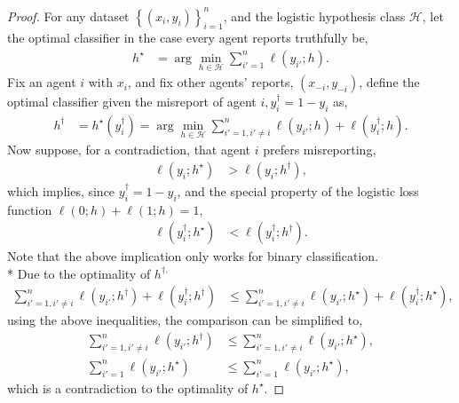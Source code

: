 \documentclass{article}
\begin{document}
\begin{proof} \label{proof:binpf} 
For any dataset $\left\{\left(x_{i}, y_{i}\right)\right\}_{i=1}^{n}$, and the logistic hypothesis class $\mathcal{H}$, let the optimal classifier in the case every agent reports truthfully be,
\begin{align*}
h^\star  &= \arg\displaystyle\min_{h \in \mathcal{H}} \displaystyle\sum_{i'=1}^{n} \ell\left(y_{i'}; h\right).
\end{align*}
Fix an agent $i $ with $x_{i}$, and fix other agents' reports, $\left(x_{-i}, y_{-i}\right)$, define the optimal classifier given the misreport of agent $i , y^{\dagger}_{i} = 1 - y_{i}$ as,
\begin{align*}
h^{\dagger} &= h^\star \left(y^{\dagger}_{i}\right) = \arg\displaystyle\min_{h \in \mathcal{H}} \displaystyle\sum_{i'=1, i' \neq  i}^{n} \ell\left(y_{i'} ; h\right) + \ell\left(y^{\dagger}_{i} ; h\right).
\end{align*}
Now suppose, for a contradiction, that agent $i $ prefers misreporting,
\begin{align*}
\ell\left(y_{i} ; h^\star \right) &> \ell\left(y_{i} ; h^{\dagger}\right),
\end{align*}
which implies, since $y^{\dagger}_{i} = 1 - y_{i}$, and the special property of the logistic loss function $\ell\left(0 ; h\right) + \ell\left(1 ; h\right) = 1$,
\begin{align*}
\ell\left(y^{\dagger}_{i} ; h^\star \right) &< \ell\left(y^{\dagger}_{i} ; h^{\dagger}\right).
\end{align*}
Note that the above implication only works for binary classification.
\\* Due to the optimality of $h^{\dagger,}$
\begin{align*}
\displaystyle\sum_{i'=1, i' \neq  i}^{n} \ell\left(y_{i'} ; h^{\dagger}\right) + \ell\left(y^{\dagger}_{i} ; h^{\dagger}\right) &\leq  \displaystyle\sum_{i'=1, i' \neq  i}^{n} \ell\left(y_{i'} ; h^\star \right) + \ell\left(y^{\dagger}_{i} ; h^\star \right),
\end{align*}
using the above inequalities, the comparison can be simplified to,
\begin{align*}
\displaystyle\sum_{i'=1, i' \neq  i}^{n} \ell\left(y_{i'} ; h^{\dagger}\right) &\leq  \displaystyle\sum_{i'=1, i' \neq  i}^{n} \ell\left(y_{i'} ; h^\star \right),
\\ \displaystyle\sum_{i'=1}^{n} \ell\left(y_{i'} ; h^\star \right) &\leq  \displaystyle\sum_{i'=1}^{n} \ell\left(y_{i'} ; h^\star \right),
\end{align*}
which is a contradiction to the optimality of $h^\star $.
\newline \newline\end{proof}
\end{document}
